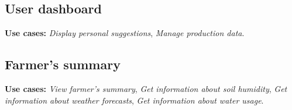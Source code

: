 \subsection{User dashboard}

\textbf{Use cases:} \textit{Display personal suggestions}, \textit{Manage production data}.

\subsection{Farmer's summary}

\textbf{Use cases:} \textit{View farmer's summary}, \textit{Get information about soil humidity}, \textit{Get information about weather forecasts}, \textit{Get information about water usage}.